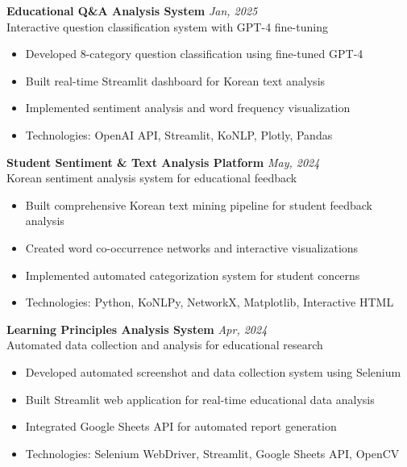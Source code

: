 \documentclass[11pt,a4paper]{article}
\begin{document}
\vspace{0.8em}

\textbf{Educational Q\&A Analysis System} \hfill \textcolor{textgray}{\textit{Jan, 2025}}\\
\textcolor{textgray}{Interactive question classification system with GPT-4 fine-tuning}
\begin{itemize}[leftmargin=1em, itemsep=0.2em, topsep=0.2em]
  \item Developed 8-category question classification using fine-tuned GPT-4
  \item Built real-time Streamlit dashboard for Korean text analysis
  \item Implemented sentiment analysis and word frequency visualization
  \item Technologies: OpenAI API, Streamlit, KoNLP, Plotly, Pandas
\end{itemize}

\vspace{0.8em}

\textbf{Student Sentiment \& Text Analysis Platform} \hfill \textcolor{textgray}{\textit{May, 2024}}\\
\textcolor{textgray}{Korean sentiment analysis system for educational feedback}
\begin{itemize}[leftmargin=1em, itemsep=0.2em, topsep=0.2em]
  \item Built comprehensive Korean text mining pipeline for student feedback analysis
  \item Created word co-occurrence networks and interactive visualizations
  \item Implemented automated categorization system for student concerns
  \item Technologies: Python, KoNLPy, NetworkX, Matplotlib, Interactive HTML
\end{itemize}

\vspace{0.8em}

\textbf{Learning Principles Analysis System} \hfill \textcolor{textgray}{\textit{Apr, 2024}}\\
\textcolor{textgray}{Automated data collection and analysis for educational research}
\begin{itemize}[leftmargin=1em, itemsep=0.2em, topsep=0.2em]
  \item Developed automated screenshot and data collection system using Selenium
  \item Built Streamlit web application for real-time educational data analysis
  \item Integrated Google Sheets API for automated report generation
  \item Technologies: Selenium WebDriver, Streamlit, Google Sheets API, OpenCV
\end{itemize}
\end{document}
